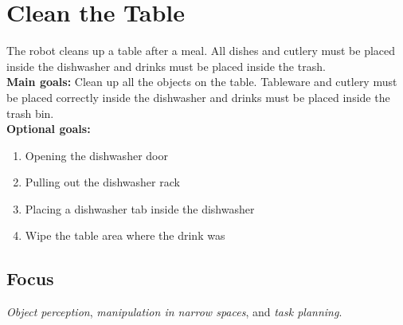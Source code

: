 \section{Clean the Table}\label{test:clean-the-table}
The robot cleans up a table after a meal. All dishes and cutlery must be placed inside the dishwasher and drinks must be placed inside the trash. \\

\noindent \textbf{Main goals:} Clean up all the objects on the table. Tableware and cutlery must be placed correctly inside the dishwasher and drinks must be placed inside the trash bin. \\

\noindent \textbf{Optional goals:}
\begin{enumerate}[nosep]
	\item Opening the dishwasher door
	\item Pulling out the dishwasher rack
	\item Placing a dishwasher tab inside the dishwasher
	\item Wipe the table area where the drink was
\end{enumerate}

\subsection*{Focus}
\emph{Object perception}, \emph{manipulation in narrow spaces}, and \emph{task planning}.

